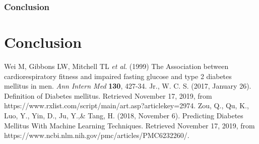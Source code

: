 \documentclass[12pt]{article}
\begin{document}


\section{Conclusion}

\newpage

\part{Conclusion}

\clearpage

\newpage

\begin{thebibliography}{}
Wei M, Gibbons LW, Mitchell TL \textit{et al}. (1999) The Association between cardiorespiratory fitness and impaired fasting glucose and type 2 diabetes mellitus in men. \textit{Ann Intern Med} \textbf{130}, 427-34.
Jr., W. C. S. (2017, January 26). Definition of Diabetes mellitus. Retrieved November 17, 2019, from https://www.rxlist.com/script/main/art.asp?articlekey=2974.
Zou, Q., Qu, K., Luo, Y., Yin, D., Ju, Y.,\& Tang, H. (2018, November 6). Predicting Diabetes Mellitus With Machine Learning Techniques. Retrieved November 17, 2019, from https://www.ncbi.nlm.nih.gov/pmc/articles/PMC6232260/.
\end{thebibliography}
\end{document}

